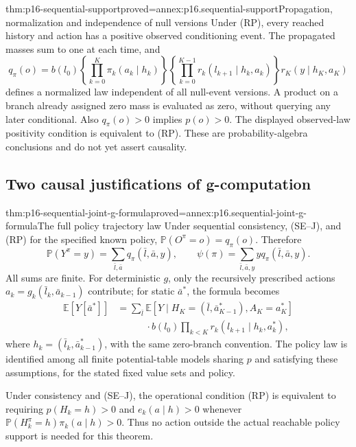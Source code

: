 \begin{hblemma}{thm:p16-sequential-support}{proved=annex:p16.sequential-support}{Propagation, normalization and independence of null versions}
Under (RP), every reached history and action has a positive observed
conditioning event. The propagated masses sum to one at each time, and
\[
 q_\pi(o)=b(l_0)\left\{\prod_{k=0}^K\pi_k(a_k\mid h_k)\right\}
             \left\{\prod_{k=0}^{K-1}r_k(l_{k+1}\mid h_k,a_k)\right\}
             r_K(y\mid h_K,a_K)                         \tag{GF}
\]
defines a normalized law independent of all null-event versions. A product
on a branch already assigned zero mass is evaluated as zero, without
querying any later conditional. Also \(q_\pi(o)>0\) implies \(p(o)>0\).
The displayed observed-law positivity condition is equivalent to (RP).
These are probability-algebra conclusions and do not yet assert causality.
\end{hblemma}

\subsection{Two causal justifications of g-computation}

\begin{hbtheorem}{thm:p16-sequential-joint-g-formula}{proved=annex:p16.sequential-joint-g-formula}{The full policy trajectory law}
Under sequential consistency, (SE--J), and (RP) for the specified known
policy, \(\mathbb P(O^\pi=o)=q_\pi(o)\). Therefore
\[
 \mathbb P(Y^\pi=y)=\sum_{\bar l,\bar a}q_\pi(\bar l,\bar a,y),
 \qquad \psi(\pi)=\sum_{\bar l,\bar a,y}yq_\pi(\bar l,\bar a,y).
\]
All sums are finite. For deterministic \(g\), only the recursively
prescribed actions \(a_k=g_k(\bar l_k,\bar a_{k-1})\) contribute; for
static \(\bar a^*\), the formula becomes
\[
\begin{aligned}
 \mathbb E[Y[\bar a^*]]
 &=\sum_{\bar l}\mathbb E[Y\mid H_K=(\bar l,\bar a^*_{K-1}),A_K=a_K^*]\\
 &\hspace{3em}\cdot b(l_0)\prod_{k<K}r_k(l_{k+1}\mid h_k,a_k^*),
\end{aligned}
\]
where \(h_k=(\bar l_k,\bar a^*_{k-1})\), with the same zero-branch
convention. The policy law is identified among
all finite potential-table models sharing \(p\) and satisfying these
assumptions, for the stated fixed value sets and policy.

Under consistency and (SE--J), the operational condition (RP) is equivalent
to requiring \(p(H_k=h)>0\) and \(e_k(a\mid h)>0\) whenever
\(\mathbb P(H_k^\pi=h)\pi_k(a\mid h)>0\). Thus no action outside the
actual reachable policy support is needed for this theorem.
\end{hbtheorem}

